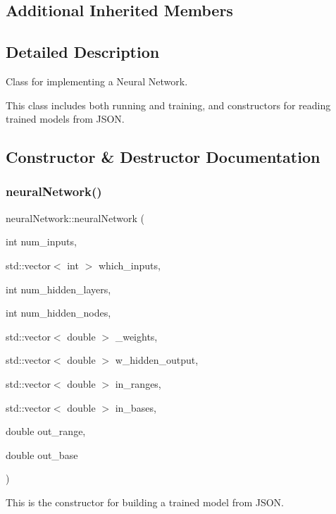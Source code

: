 \subsection*{Additional Inherited Members}


\subsection{Detailed Description}
Class for implementing a Neural Network.

This class includes both running and training, and constructors for reading trained models from J\+S\+ON. 

\subsection{Constructor \& Destructor Documentation}
\mbox{\label{classneural_network_aee6fd482cd0b6b4004759bb57d4b14db}} 
\subsubsection{\texorpdfstring{neural\+Network()}{neuralNetwork()}\hspace{0.1cm}{\footnotesize\ttfamily [1/2]}}
{\footnotesize\ttfamily neural\+Network\+::neural\+Network (\begin{DoxyParamCaption}\item[{int}]{num\+\_\+inputs,  }\item[{std\+::vector$<$ int $>$}]{which\+\_\+inputs,  }\item[{int}]{num\+\_\+hidden\+\_\+layers,  }\item[{int}]{num\+\_\+hidden\+\_\+nodes,  }\item[{std\+::vector$<$ double $>$}]{\+\_\+weights,  }\item[{std\+::vector$<$ double $>$}]{w\+\_\+hidden\+\_\+output,  }\item[{std\+::vector$<$ double $>$}]{in\+\_\+ranges,  }\item[{std\+::vector$<$ double $>$}]{in\+\_\+bases,  }\item[{double}]{out\+\_\+range,  }\item[{double}]{out\+\_\+base }\end{DoxyParamCaption})}

This is the constructor for building a trained model from J\+S\+ON. \mbox{\label{classneural_network_ad5cad1e6ac86745ab47fceeb8d42cbd9}} 
